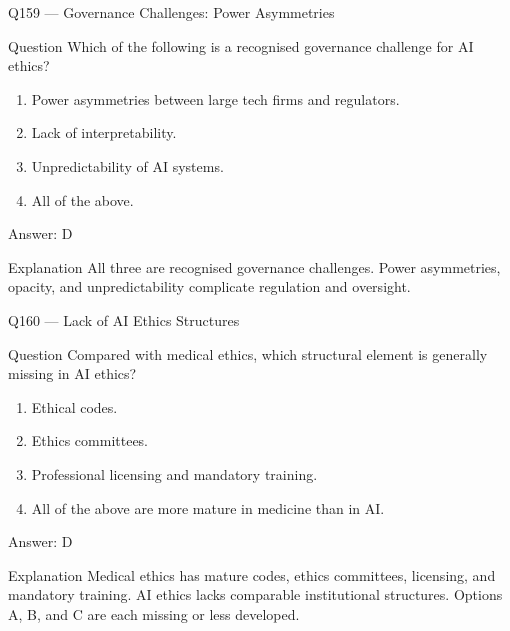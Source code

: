 \documentclass[aspectratio=169,8pt]{beamer}
\begin{document}
\begin{frame}{Q159 --- Governance Challenges: Power Asymmetries}
\begin{block}{Question}
Which of the following is a recognised governance challenge for AI ethics?
\begin{enumerate}
\item Power asymmetries between large tech firms and regulators.
\item Lack of interpretability.
\item Unpredictability of AI systems.
\item All of the above.
\end{enumerate}  \end{block}
\begin{exampleblock}{Answer: D}\end{exampleblock}
\begin{block}{Explanation}
All three are recognised governance challenges. Power asymmetries, opacity, and unpredictability complicate regulation and oversight.
\end{block}
\end{frame}

\begin{frame}{Q160 --- Lack of AI Ethics Structures}
\begin{block}{Question}
Compared with medical ethics, which structural element is generally missing in AI ethics?
\begin{enumerate}
\item Ethical codes.
\item Ethics committees.
\item Professional licensing and mandatory training.
\item All of the above are more mature in medicine than in AI.
\end{enumerate}  \end{block}
\begin{exampleblock}{Answer: D}\end{exampleblock}
\begin{block}{Explanation}
Medical ethics has mature codes, ethics committees, licensing, and mandatory training. AI ethics lacks comparable institutional structures. Options A, B, and C are each missing or less developed.
\end{block}
\end{frame}
\end{document}
